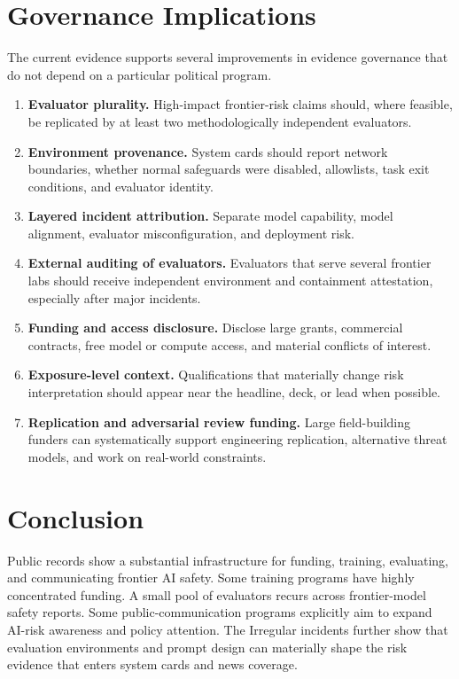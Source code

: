 \documentclass[11pt,twoside]{article}
\begin{document}
\section{Governance Implications}
The current evidence supports several improvements in evidence governance that do not depend on a particular political program.
\begin{enumerate}
\item \textbf{Evaluator plurality.} High-impact frontier-risk claims should, where feasible, be replicated by at least two methodologically independent evaluators.
\item \textbf{Environment provenance.} System cards should report network boundaries, whether normal safeguards were disabled, allowlists, task exit conditions, and evaluator identity.
\item \textbf{Layered incident attribution.} Separate model capability, model alignment, evaluator misconfiguration, and deployment risk.
\item \textbf{External auditing of evaluators.} Evaluators that serve several frontier labs should receive independent environment and containment attestation, especially after major incidents.
\item \textbf{Funding and access disclosure.} Disclose large grants, commercial contracts, free model or compute access, and material conflicts of interest.
\item \textbf{Exposure-level context.} Qualifications that materially change risk interpretation should appear near the headline, deck, or lead when possible.
\item \textbf{Replication and adversarial review funding.} Large field-building funders can systematically support engineering replication, alternative threat models, and work on real-world constraints.
\end{enumerate}

\section{Conclusion}
Public records show a substantial infrastructure for funding, training, evaluating, and communicating frontier AI safety. Some training programs have highly concentrated funding. A small pool of evaluators recurs across frontier-model safety reports. Some public-communication programs explicitly aim to expand AI-risk awareness and policy attention. The Irregular incidents further show that evaluation environments and prompt design can materially shape the risk evidence that enters system cards and news coverage.
\end{document}
